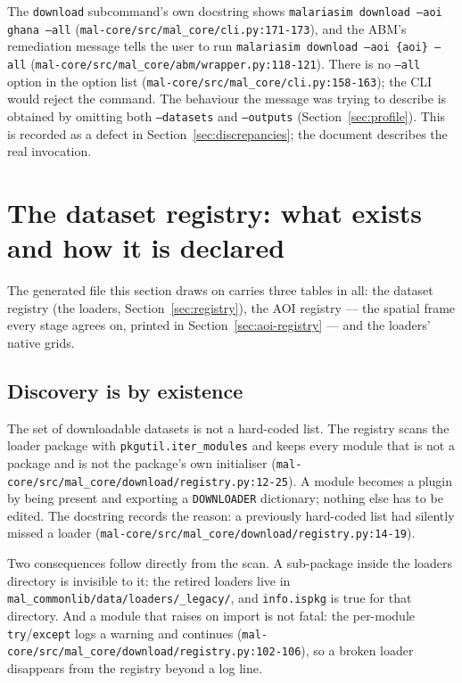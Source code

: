 \documentclass[11pt,a4paper]{article}
\newcommand{\code}[1]{\texttt{#1}}
\begin{document}
The \code{download} subcommand's own docstring shows
\code{malariasim download --aoi ghana --all}
(\code{mal-core/src/mal\_core/cli.py:171-173}), and the ABM's remediation
message tells the user to run \code{malariasim download --aoi \{aoi\} --all}
(\code{mal-core/src/mal\_core/abm/wrapper.py:118-121}). There is no \code{--all}
option in the option list
(\code{mal-core/src/mal\_core/cli.py:158-163}); the CLI would reject the
command. The behaviour the message was trying to describe is obtained by
omitting both \code{--datasets} and \code{--outputs}
(Section~\ref{sec:profile}). This is recorded as a defect in
Section~\ref{sec:discrepancies}; the document describes the real invocation.

\section{The dataset registry: what exists and how it is declared}

The generated file this section draws on carries three tables in all: the
dataset registry (the loaders, Section~\ref{sec:registry}), the AOI registry
--- the spatial frame every stage agrees on, printed in
Section~\ref{sec:aoi-registry} --- and the loaders' native grids.

\subsection{Discovery is by existence}

The set of downloadable datasets is not a hard-coded list. The registry scans
the loader package with \code{pkgutil.iter\_modules} and keeps every module
that is not a package and is not the package's own initialiser
(\code{mal-core/src/mal\_core/download/registry.py:12-25}). A module becomes a
plugin by being present and exporting a \code{DOWNLOADER} dictionary; nothing
else has to be edited. The docstring records the reason: a previously
hard-coded list had silently missed a loader
(\code{mal-core/src/mal\_core/download/registry.py:14-19}).

Two consequences follow directly from the scan. A sub-package inside the
loaders directory is invisible to it: the retired loaders live in
\code{mal\_commonlib/data/loaders/\_legacy/}, and \code{info.ispkg} is true
for that directory. And a module that raises on import is not fatal: the
per-module \code{try}/\code{except} logs a warning and continues
(\code{mal-core/src/mal\_core/download/registry.py:102-106}), so a broken
loader disappears from the registry beyond a log line.
\end{document}
